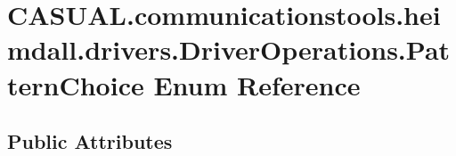 \hypertarget{enum_c_a_s_u_a_l_1_1communicationstools_1_1heimdall_1_1drivers_1_1_driver_operations_1_1_pattern_choice}{\section{C\-A\-S\-U\-A\-L.\-communicationstools.\-heimdall.\-drivers.\-Driver\-Operations.\-Pattern\-Choice Enum Reference}
\label{enum_c_a_s_u_a_l_1_1communicationstools_1_1heimdall_1_1drivers_1_1_driver_operations_1_1_pattern_choice}
}
\subsection*{Public Attributes}

